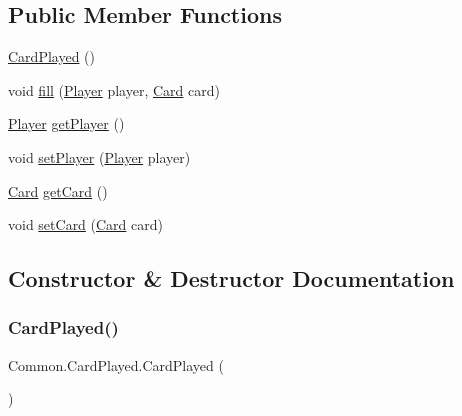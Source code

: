 \subsection*{Public Member Functions}
\begin{DoxyCompactItemize}
\item 
\mbox{\hyperlink{classCommon_1_1CardPlayed_ac419f1ab40063fda2fd341bbc573881b}{Card\+Played}} ()
\item 
void \mbox{\hyperlink{classCommon_1_1CardPlayed_a1fd0f482239ffca7af9f38e612e968ec}{fill}} (\mbox{\hyperlink{classCommon_1_1Player}{Player}} player, \mbox{\hyperlink{classCommon_1_1Card}{Card}} card)
\item 
\mbox{\hyperlink{classCommon_1_1Player}{Player}} \mbox{\hyperlink{classCommon_1_1CardPlayed_a2d9995ec0df85ae12c7dc77776f8043e}{get\+Player}} ()
\item 
void \mbox{\hyperlink{classCommon_1_1CardPlayed_ab1e8317983a794c99aef643569ba93ce}{set\+Player}} (\mbox{\hyperlink{classCommon_1_1Player}{Player}} player)
\item 
\mbox{\hyperlink{classCommon_1_1Card}{Card}} \mbox{\hyperlink{classCommon_1_1CardPlayed_a5db9f3b0525f633cf74ca94b379c80ff}{get\+Card}} ()
\item 
void \mbox{\hyperlink{classCommon_1_1CardPlayed_ad456e1fb513fb05d53f21d80f399fa24}{set\+Card}} (\mbox{\hyperlink{classCommon_1_1Card}{Card}} card)
\end{DoxyCompactItemize}


\subsection{Constructor \& Destructor Documentation}
\mbox{\label{classCommon_1_1CardPlayed_ac419f1ab40063fda2fd341bbc573881b}} 
\subsubsection{\texorpdfstring{Card\+Played()}{CardPlayed()}}
{\footnotesize\ttfamily Common.\+Card\+Played.\+Card\+Played (\begin{DoxyParamCaption}{ }\end{DoxyParamCaption})\hspace{0.3cm}{\ttfamily [inline]}}



